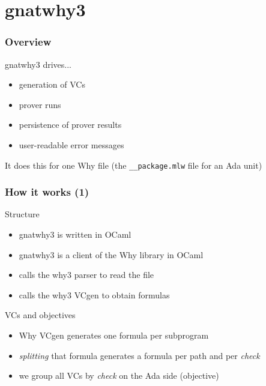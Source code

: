 \documentclass{beamer}
\newenvironment{specialframe}{%
  \begin{frame}[fragile,environment=specialframe]}{\end{frame}}
\begin{document}


\section{gnatwhy3}

\begin{specialframe}\frametitle{Overview}
   gnatwhy3 drives...
      \begin{itemize}
      \item generation of VCs
      \item prover runs
      \item persistence of prover results
      \item user-readable error messages
      \end{itemize}
      It does this for one Why file (the \verb|__package.mlw| file for an Ada
      unit)
\end{specialframe}

\begin{specialframe}\frametitle{How it works (1)}
   \begin{block}{Structure}
   \begin{itemize}
   \item gnatwhy3 is written in OCaml
   \item gnatwhy3 is a client of the Why library in OCaml
   \item calls the why3 parser to read the file
   \item calls the why3 VCgen to obtain formulas
   \end{itemize}
   \end{block}

   \begin{block}{VCs and objectives}
   \begin{itemize}
   \item Why VCgen generates one formula per subprogram
   \item \emph{splitting} that formula generates a formula per path and per
     \emph{check}
   \item we group all VCs by \emph{check} on the Ada side (objective)
   \end{itemize}
   \end{block}

\end{specialframe}
\end{document}
